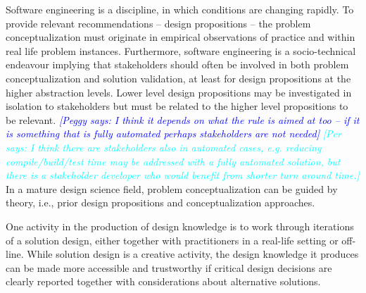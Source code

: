 \documentclass[graybox]{svmult}
\newcommand{\peggy}[1]{\textcolor{blue}{{\it [Peggy says: #1]}}}
\newcommand{\per}[1]{\textcolor{cyan}{{\it [Per says: #1]}}}
\newcommand{\peggy}[1]{}
\newcommand{\per}[1]{}
\begin{document}
Software engineering is a discipline, in which conditions are changing rapidly. To provide relevant recommendations -- design propositions --  the problem conceptualization must originate in empirical observations of practice and within real life problem instances. Furthermore, software engineering is a socio-technical endeavour implying that stakeholders should often be involved in both problem conceptualization and solution validation, at least for design propositions at the higher abstraction levels. Lower level design propositions may be investigated in isolation to stakeholders but must be related to the higher level propositions to be relevant. 
\peggy{I think it depends on what the rule is aimed at too -- if it is something that is fully automated perhaps stakeholders are not needed} \per{I think there are stakeholders also in automated cases, e.g. reducing compile/build/test time may be addressed with a fully automated solution, but there is a stakeholder developer who would benefit from shorter turn around time.}
In a mature design science field, problem conceptualization can be guided by theory, i.e., prior design propositions and conceptualization approaches. 


One activity in the production of design knowledge is to work through iterations of a solution design, either together with practitioners in a real-life setting or off-line. 
While solution design is a creative activity, the design knowledge it produces can be made more accessible and trustworthy if critical design decisions are clearly reported together with considerations about alternative solutions.

\end{document}
